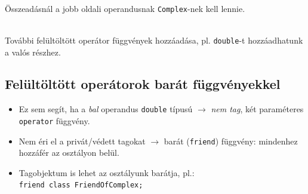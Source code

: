 \documentclass[usenames,dvipsnames,aspectratio=169]{beamer}
\begin{document}
\begin{frame}
    \begin{description}[mm]
        \item[Probléma:] \hfill \\ Összeadásnál a jobb oldali operandusnak \texttt{Complex}-nek kell lennie.
        \item[Megoldás:] \hfill \\ További felültöltött operátor függvények hozzáadása, pl. \texttt{double}-t hozzáadhatunk a valós részhez.
    \end{description}
    \begin{exampleblock}{}
        
    \end{exampleblock}
\end{frame}

\begin{frame}
    \begin{exampleblock}{}
        \small
        
    \end{exampleblock}
\end{frame}

\subsection{Felültöltött operátorok barát függvényekkel}

\begin{frame}
    \begin{itemize}
        \item Ez sem segít, ha a \emph{bal} operandus \texttt{double} típusú $\to$ \emph{nem tag}, két paraméteres \texttt{operator} függvény.
        \item Nem éri el a privát/védett tagokat $\to$ barát (\texttt{friend}) függvény: mindenhez hozzáfér az osztályon belül.
        \item Tagobjektum is lehet az osztályunk barátja, pl.: \\ \texttt{friend class FriendOfComplex;}
    \end{itemize}
\end{frame}

\begin{frame}
    \begin{exampleblock}{}
        \scriptsize
        
        
    \end{exampleblock}
\end{frame}
\end{document}
